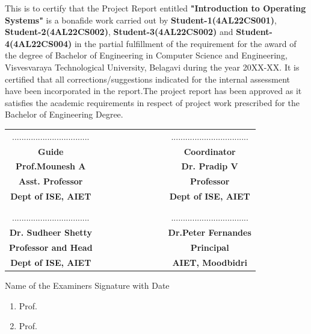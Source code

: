 \documentclass{article}
\begin{document}
\begin{center}
\begin{large}
This is to certify that the Project Report entitled 
\textbf{"Introduction to Operating Systems"} 
is a bonafide work carried out by 
\textbf{Student-1(4AL22CS001)}, 
\textbf{Student-2(4AL22CS002)}, 
\textbf{Student-3(4AL22CS002)} 
and \textbf{Student-4(4AL22CS004)} 
in the partial fulfillment of the requirement for the award of the degree of Bachelor of 
Engineering in Computer Science and Engineering, Visvesvaraya Technological University, 
Belagavi during the year 20XX-XX. It is certified that all corrections/suggestions 
indicated for the internal assessment have been incorporated in the report.The project 
report has been approved as it satisfies the academic requirements in respect of project 
work prescribed for the Bachelor of Engineering Degree.
\end{large}
\vspace{1cm}
\begin{table}[h!]
\centering
\begin{tabular}{cccccccccc}
.................................&&&&&&&&& .................................\\
\textbf{{\footnotesize Guide}} &&&&&&&&&\textbf{{\footnotesize Coordinator}}\\
\textbf{Prof.Mounesh A}&&&&&&&&& \textbf{Dr. Pradip V} \\
\textbf{{\footnotesize Asst. Professor}} &&&&&&&&& \textbf{{\footnotesize 
Professor}}\\
\textbf{{\footnotesize Dept of ISE, AIET}} &&&&&&&&& \textbf{{\footnotesize Dept of 
ISE, AIET}}\\
\\
\\
.................................&&&&&&&&& .................................\\
\textbf{Dr. Sudheer Shetty} &&&&&&&&& \textbf{Dr.Peter Fernandes} \\
\textbf{{\footnotesize Professor and Head}} &&&&&&&&& \textbf{{\footnotesize 
Principal}} \\
\textbf{{\footnotesize Dept of ISE, AIET}} &&&&&&&&& \textbf{{\footnotesize AIET, 
Moodbidri}}\\
\end{tabular} 
\end{table}
\begin{normalsize}
 
\vfill
Name of the Examiners \hfill Signature with Date
\end{normalsize}
\begin{normalsize}
 
\begin{enumerate}
\item Prof.
\item Prof.
\end{enumerate}
\end{normalsize}
 \end{center}
\end{document}
